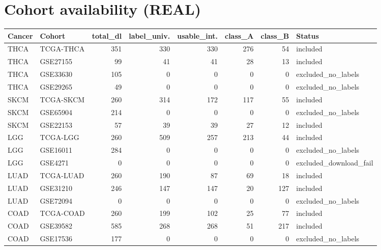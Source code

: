 \documentclass[11pt,a4paper]{article}
\begin{document}
\section{Cohort availability (REAL)}
\begin{tabular}{llrrrrrl}\toprule
Cancer & Cohort & total\_dl & label\_univ. & usable\_int. & class\_A & class\_B & Status \\ \midrule
THCA & TCGA-THCA & 351 & 330 & 330 & 276 & 54 & included \\
THCA & GSE27155 & 99 & 41 & 41 & 28 & 13 & included \\
THCA & GSE33630 & 105 & 0 & 0 & 0 & 0 & excluded\_no\_labels \\
THCA & GSE29265 & 49 & 0 & 0 & 0 & 0 & excluded\_no\_labels \\
SKCM & TCGA-SKCM & 260 & 314 & 172 & 117 & 55 & included \\
SKCM & GSE65904 & 214 & 0 & 0 & 0 & 0 & excluded\_no\_labels \\
SKCM & GSE22153 & 57 & 39 & 39 & 27 & 12 & included \\
LGG & TCGA-LGG & 260 & 509 & 257 & 213 & 44 & included \\
LGG & GSE16011 & 284 & 0 & 0 & 0 & 0 & excluded\_no\_labels \\
LGG & GSE4271 & 0 & 0 & 0 & 0 & 0 & excluded\_download\_fail \\
LUAD & TCGA-LUAD & 260 & 190 & 87 & 69 & 18 & included \\
LUAD & GSE31210 & 246 & 147 & 147 & 20 & 127 & included \\
LUAD & GSE72094 & 0 & 0 & 0 & 0 & 0 & excluded\_no\_labels \\
COAD & TCGA-COAD & 260 & 199 & 102 & 25 & 77 & included \\
COAD & GSE39582 & 585 & 268 & 268 & 51 & 217 & included \\
COAD & GSE17536 & 177 & 0 & 0 & 0 & 0 & excluded\_no\_labels \\
\bottomrule\end{tabular}
\end{document}

